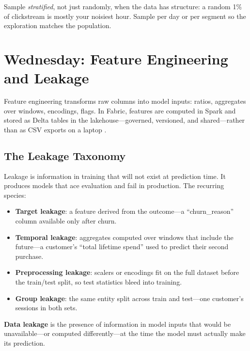 \begin{tipbox}
Sample \emph{stratified}, not just randomly, when the data has structure: a random 1\% of clickstream is mostly your noisiest hour. Sample per day or per segment so the exploration matches the population.
\end{tipbox}

\section{Wednesday: Feature Engineering and Leakage}
Feature engineering transforms raw columns into model inputs: ratios, aggregates over windows, encodings, flags. In Fabric, features are computed in Spark and stored as Delta tables in the lakehouse---governed, versioned, and shared---rather than as CSV exports on a laptop \cite{microsoftFabricDataScience,microsoftFabricNotebooks}.

\subsection{The Leakage Taxonomy}
Leakage is information in training that will not exist at prediction time. It produces models that ace evaluation and fail in production. The recurring species:

\begin{itemize}
    \item \textbf{Target leakage}: a feature derived from the outcome---a ``churn\_reason'' column available only after churn.
    \item \textbf{Temporal leakage}: aggregates computed over windows that include the future---a customer's ``total lifetime spend'' used to predict their second purchase.
    \item \textbf{Preprocessing leakage}: scalers or encodings fit on the full dataset before the train/test split, so test statistics bleed into training.
    \item \textbf{Group leakage}: the same entity split across train and test---one customer's sessions in both sets.
\end{itemize}

\begin{definitionbox}
\textbf{Data leakage} is the presence of information in model inputs that would be unavailable---or computed differently---at the time the model must actually make its prediction.
\end{definitionbox}

